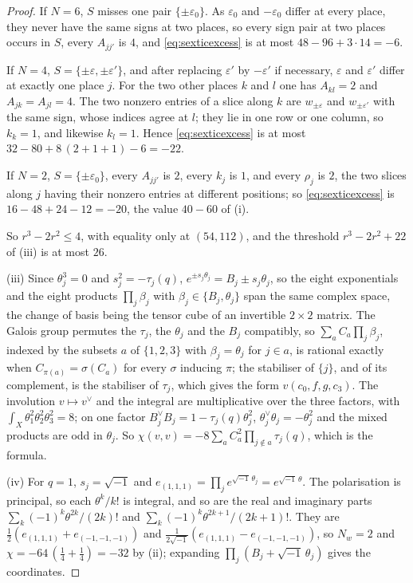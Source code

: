 \begin{proof}
If $N=6$, $S$ misses one pair $\{\pm\varepsilon_{0}\}$. As $\varepsilon_{0}$
and $-\varepsilon_{0}$ differ at every place, they never have the same signs
at two places, so every sign pair at two places occurs in $S$, every
$A_{jj'}$ is $4$, and \eqref{eq:sexticexcess} is at most $48-96+3\cdot14=-6$.

If $N=4$, $S=\{\pm\varepsilon,\pm\varepsilon'\}$, and after replacing
$\varepsilon'$ by $-\varepsilon'$ if necessary, $\varepsilon$ and
$\varepsilon'$ differ at exactly one place $j$. For the two other places $k$
and $l$ one has $A_{kl}=2$ and $A_{jk}=A_{jl}=4$. The two nonzero entries of
a slice along $k$ are $w_{\pm\varepsilon}$ and $w_{\pm\varepsilon'}$ with the
same sign, whose indices agree at $l$; they lie in one row or one column, so
$k_{k}=1$, and likewise $k_{l}=1$. Hence \eqref{eq:sexticexcess} is at most
$32-80+8\,(2+1+1)-6=-22$.

If $N=2$, $S=\{\pm\varepsilon_{0}\}$, every $A_{jj'}$ is $2$, every $k_{j}$ is
$1$, and every $\rho_{j}$ is $2$, the two slices along $j$ having their
nonzero entries at different positions; so \eqref{eq:sexticexcess} is
$16-48+24-12=-20$, the value $40-60$ of (i).

So $r^{3}-2r^{2}\le4$, with equality only at $(54,112)$, and the threshold
$r^{3}-2r^{2}+22$ of (iii) is at most $26$.

(iii) Since $\theta_{j}^{3}=0$ and $s_{j}^{2}=-\tau_{j}(q)$,
$e^{\pm s_{j}\theta_{j}}=B_{j}\pm s_{j}\theta_{j}$, so the eight exponentials
and the eight products $\prod_{j}\beta_{j}$ with $\beta_{j}\in\{B_{j},\theta_{j}\}$
span the same complex space, the change of basis being the tensor cube of an
invertible $2\times2$ matrix. The Galois group permutes the $\tau_{j}$, the
$\theta_{j}$ and the $B_{j}$ compatibly, so $\sum_{a}C_{a}\prod_{j}\beta_{j}$,
indexed by the subsets $a$ of $\{1,2,3\}$ with $\beta_{j}=\theta_{j}$ for
$j\in a$, is rational exactly when $C_{\pi(a)}=\sigma(C_{a})$ for every
$\sigma$ inducing $\pi$; the stabiliser of $\{j\}$, and of its complement,
is the stabiliser of $\tau_{j}$, which gives the form $v(c_{0},f,g,c_{3})$.
The involution $v\mapsto v^{\vee}$ and the integral are multiplicative over
the three factors, with $\int_{X}\theta_{1}^{2}\theta_{2}^{2}\theta_{3}^{2}=8$;
on one factor $B_{j}^{\vee}B_{j}=1-\tau_{j}(q)\theta_{j}^{2}$,
$\theta_{j}^{\vee}\theta_{j}=-\theta_{j}^{2}$ and the mixed products are odd
in $\theta_{j}$. So
$\chi(v,v)=-8\sum_{a}C_{a}^{2}\prod_{j\notin a}\tau_{j}(q)$, which is the
formula.

(iv) For $q=1$, $s_{j}=\sqrt{-1}$ and $e_{(1,1,1)}=\prod_{j}e^{\sqrt{-1}\,
\theta_{j}}=e^{\sqrt{-1}\,\theta}$. The polarisation is principal, so each
$\theta^{k}/k!$ is integral, and so are the real and imaginary parts
$\sum_{k}(-1)^{k}\theta^{2k}/(2k)!$ and $\sum_{k}(-1)^{k}\theta^{2k+1}/(2k+1)!$.
They are $\tfrac12(e_{(1,1,1)}+e_{(-1,-1,-1)})$ and
$\tfrac1{2\sqrt{-1}}(e_{(1,1,1)}-e_{(-1,-1,-1)})$, so $N_{w}=2$ and
$\chi=-64\,(\tfrac14+\tfrac14)=-32$ by (ii); expanding
$\prod_{j}(B_{j}+\sqrt{-1}\,\theta_{j})$ gives the coordinates.
\end{proof}


